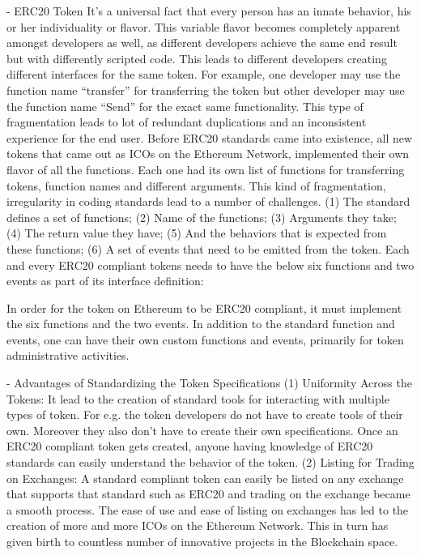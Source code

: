 \documentclass[conference]{IEEEtran}
\begin{document}
-	 ERC20 Token
It’s a universal fact that every person has an innate behavior, his or her individuality or flavor. This variable flavor becomes completely apparent amongst developers as well, as different developers achieve the same end result but with differently scripted code. This leads to different developers creating different interfaces for the same token.
For example, one developer may use the function name “transfer” for transferring the token but other developer may use the function name “Send” for the exact same functionality. This type of fragmentation leads to lot of redundant duplications and an inconsistent experience for the end user.
Before ERC20 standards came into existence, all new tokens that came out as ICOs on the Ethereum Network, implemented their own flavor of all the functions. Each one had its own list of functions for transferring tokens, function names and different arguments.
This kind of fragmentation, irregularity in coding standards lead to a number of challenges.
(1)	The standard defines a set of functions;
(2)	Name of the functions;
(3)	Arguments they take;
(4)	The return value they have;
(5)	 And the behaviors that is expected from these functions;
(6)	A set of events that need to be emitted from the token.
Each and every ERC20 compliant tokens needs to have the below six functions and two events as part of its interface definition:

In order for the token on Ethereum to be ERC20 compliant, it must implement the six functions and the two events. In addition to the standard function and events, one can have their own custom functions and events, primarily for token administrative activities.

-	 Advantages of Standardizing the Token Specifications
(1)	Uniformity Across the Tokens: It lead to the creation of standard tools for interacting with multiple types of token. For e.g. the token developers do not have to create tools of their own. Moreover they also don’t have to create their own specifications. Once an ERC20 compliant token gets created, anyone having knowledge of ERC20 standards can easily understand the behavior of the token.
(2)	Listing for Trading on Exchanges: A standard compliant token can easily be listed on any exchange that supports that standard such as ERC20 and trading on the exchange became a smooth process. The ease of use and ease of listing on exchanges has led to the creation of more and more ICOs on the Ethereum Network. This in turn has given birth to countless number of innovative projects in the Blockchain space.
\end{document}
